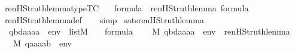 \begin{isabellebody}
\isanewline
{}\isamarkupfalse%
\ ren{\isacharunderscore}{\kern0pt}HS{\isacharunderscore}{\kern0pt}truth{\isacharunderscore}{\kern0pt}lemma{\isacharunderscore}{\kern0pt}type{\isacharbrackleft}{\kern0pt}TC{\isacharbrackright}{\kern0pt}\ {\isacharcolon}{\kern0pt}\isanewline
\ \ {\isachardoublequoteopen}{\isasymphi}{\isasymin}formula\ {\isasymLongrightarrow}\ ren{\isacharunderscore}{\kern0pt}HS{\isacharunderscore}{\kern0pt}truth{\isacharunderscore}{\kern0pt}lemma{\isacharparenleft}{\kern0pt}{\isasymphi}{\isacharparenright}{\kern0pt}\ {\isasymin}formula{\isachardoublequoteclose}\ \isanewline
%
\isadelimproof
\ \ %
\endisadelimproof
%
\isatagproof
{}\isamarkupfalse%
\ ren{\isacharunderscore}{\kern0pt}HS{\isacharunderscore}{\kern0pt}truth{\isacharunderscore}{\kern0pt}lemma{\isacharunderscore}{\kern0pt}def\isanewline
\ \ \isamarkupfalse%
\ simp%
\endisatagproof
{\isafoldproof}%
%
\isadelimproof
\isanewline
%
\endisadelimproof
\isanewline
{}\isamarkupfalse%
\ sats{\isacharunderscore}{\kern0pt}ren{\isacharunderscore}{\kern0pt}HS{\isacharunderscore}{\kern0pt}truth{\isacharunderscore}{\kern0pt}lemma{\isacharcolon}{\kern0pt}\isanewline
\ \ {\isachardoublequoteopen}{\isacharbrackleft}{\kern0pt}q{\isacharcomma}{\kern0pt}b{\isacharcomma}{\kern0pt}d{\isacharcomma}{\kern0pt}a{}{\isacharcomma}{\kern0pt}a{}{\isacharcomma}{\kern0pt}a{}{\isacharcomma}{\kern0pt}a{}{\isacharbrackright}{\kern0pt}\ {\isacharat}{\kern0pt}\ env\ {\isasymin}\ list{\isacharparenleft}{\kern0pt}M{\isacharparenright}{\kern0pt}\ {\isasymLongrightarrow}\ {\isasymphi}\ {\isasymin}\ formula\ {\isasymLongrightarrow}\isanewline
\ \ \ {\isacharparenleft}{\kern0pt}M{\isacharcomma}{\kern0pt}\ {\isacharbrackleft}{\kern0pt}q{\isacharcomma}{\kern0pt}b{\isacharcomma}{\kern0pt}d{\isacharcomma}{\kern0pt}a{}{\isacharcomma}{\kern0pt}a{}{\isacharcomma}{\kern0pt}a{}{\isacharcomma}{\kern0pt}a{}{\isacharbrackright}{\kern0pt}\ {\isacharat}{\kern0pt}\ env\ {\isasymTurnstile}\ ren{\isacharunderscore}{\kern0pt}HS{\isacharunderscore}{\kern0pt}truth{\isacharunderscore}{\kern0pt}lemma{\isacharparenleft}{\kern0pt}{\isasymphi}{\isacharparenright}{\kern0pt}\ {\isacharparenright}{\kern0pt}\ {\isasymlongleftrightarrow}\isanewline
\ \ \ {\isacharparenleft}{\kern0pt}M{\isacharcomma}{\kern0pt}\ {\isacharbrackleft}{\kern0pt}q{\isacharcomma}{\kern0pt}a{}{\isacharcomma}{\kern0pt}a{}{\isacharcomma}{\kern0pt}a{}{\isacharcomma}{\kern0pt}a{}{\isacharcomma}{\kern0pt}b{\isacharbrackright}{\kern0pt}\ {\isacharat}{\kern0pt}\ env\ {\isasymTurnstile}\ {\isasymphi}{\isacharparenright}{\kern0pt}{\isachardoublequoteclose}\isanewline

\end{isabellebody}
